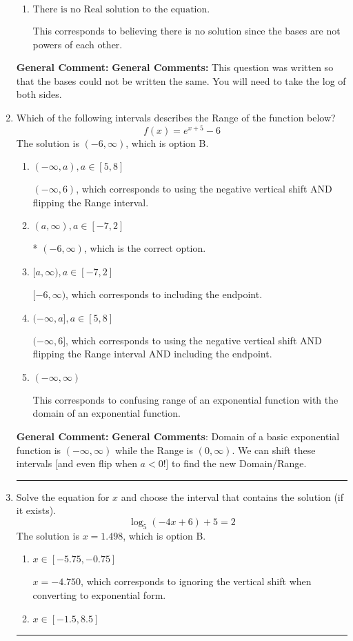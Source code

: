 \documentclass{extbook}[14pt]
\newcommand{\litem}[1]{\item #1

\rule{\textwidth}{0.4pt}}
\begin{document}
\begin{enumerate}
{\begin{enumerate}[label=\Alph*.]
$x = -9.000$, which corresponds to solving the numerators as equal while ignoring the bases are different.
\item \( \text{There is no Real solution to the equation.} \)

This corresponds to believing there is no solution since the bases are not powers of each other.
\end{enumerate}

\textbf{General Comment:} \textbf{General Comments:} This question was written so that the bases could not be written the same. You will need to take the log of both sides.
}
\litem{
Which of the following intervals describes the Range of the function below?
\[ f(x) = e^{x+5}-6 \]The solution is \( (-6, \infty) \), which is option B.\begin{enumerate}[label=\Alph*.]
\item \( (-\infty, a), a \in [5, 8] \)

$(-\infty, 6)$, which corresponds to using the negative vertical shift AND flipping the Range interval.
\item \( (a, \infty), a \in [-7, 2] \)

* $(-6, \infty)$, which is the correct option.
\item \( [a, \infty), a \in [-7, 2] \)

$[-6, \infty)$, which corresponds to including the endpoint.
\item \( (-\infty, a], a \in [5, 8] \)

$(-\infty, 6]$, which corresponds to using the negative vertical shift AND flipping the Range interval AND including the endpoint.
\item \( (-\infty, \infty) \)

This corresponds to confusing range of an exponential function with the domain of an exponential function.
\end{enumerate}

\textbf{General Comment:} \textbf{General Comments}: Domain of a basic exponential function is $(-\infty, \infty)$ while the Range is $(0, \infty)$. We can shift these intervals [and even flip when $a<0$!] to find the new Domain/Range.
}
\litem{
Solve the equation for $x$ and choose the interval that contains the solution (if it exists).
\[ \log_{5}{(-4x+6)}+5 = 2 \]The solution is \( x = 1.498 \), which is option B.\begin{enumerate}[label=\Alph*.]
\item \( x \in [-5.75, -0.75] \)

$x = -4.750$, which corresponds to ignoring the vertical shift when converting to exponential form.
\item \( x \in [-1.5, 8.5] \)


\end{enumerate}}
\end{enumerate}
\end{document}
